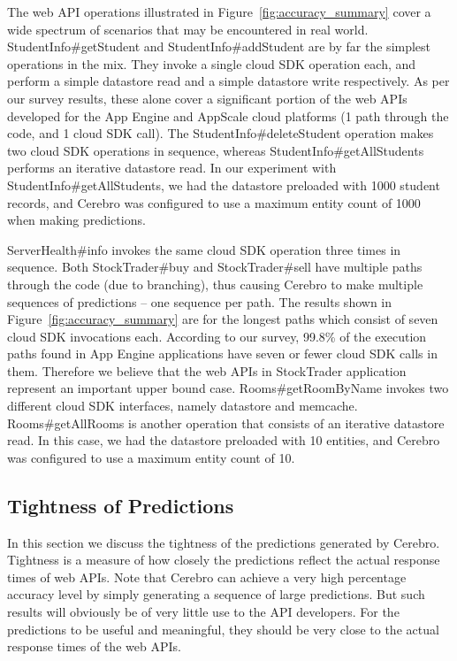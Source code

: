 The web API operations illustrated in Figure~\ref{fig:accuracy_summary} cover a wide spectrum of scenarios that may be encountered
in real world. StudentInfo\#getStudent and StudentInfo\#addStudent are by far the simplest
operations in the mix. They invoke a single cloud SDK operation each, and perform a simple datastore read and a simple
datastore write respectively. As per our survey results, these alone cover a significant portion of the 
web APIs developed for the App Engine and AppScale cloud platforms (1 path through the code, and 1 cloud SDK call). 
The StudentInfo\#deleteStudent operation makes two cloud SDK operations in sequence, whereas
StudentInfo\#getAllStudents performs an iterative datastore read.
In our experiment with StudentInfo\#getAllStudents, we had the datastore preloaded with 1000 student records, 
and Cerebro was configured to use a maximum entity count of 1000 when making predictions.

ServerHealth\#info invokes the same cloud SDK operation three times in sequence. Both StockTrader\#buy and StockTrader\#sell have
multiple paths through the code (due to branching), thus causing Cerebro to make multiple sequences of predictions -- one sequence
per path. The results shown in Figure~\ref{fig:accuracy_summary} are for the longest paths which consist of seven cloud SDK invocations each. According to
our survey, 99.8\% of the execution paths found in App Engine applications have seven or fewer cloud SDK calls in them. Therefore we believe
that the web APIs in StockTrader application represent an important upper bound case. Rooms\#getRoomByName
invokes two different cloud SDK interfaces, namely datastore and memcache. Rooms\#getAllRooms is another operation that consists of
an iterative datastore read. In this case, we had the datastore preloaded with 10 entities, and Cerebro was configured to use a maximum entity
count of 10. %

\subsection{Tightness of Predictions}
In this section we discuss the tightness of the predictions generated by Cerebro. Tightness is a measure of how closely the predictions
reflect the actual response times of web APIs. 
Note that Cerebro can achieve a very high percentage accuracy level by simply generating a 
sequence of large predictions. But such results will obviously be of very little use to the API
developers. For the predictions to be useful and meaningful, they should be very close to the actual response times of the web APIs.

